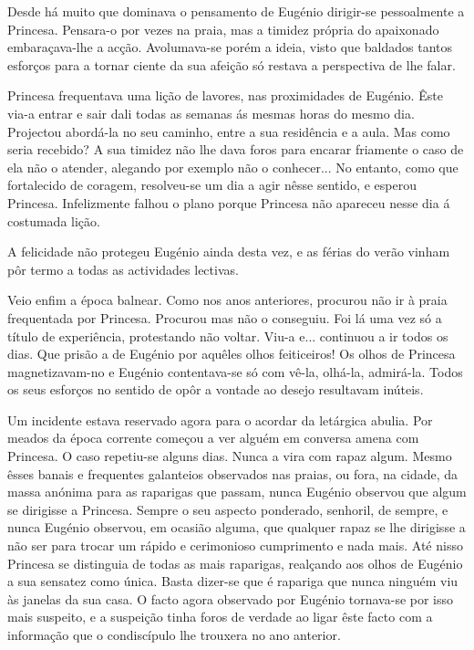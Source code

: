 \documentclass[9pt]{article}
\begin{document}
Desde há muito que dominava o pensamento de Eugé\-nio dirigir-se pessoalmente a Princesa. Pensara-o por vezes na praia, mas a timidez própria do
apaixonado embaraçava-\-lhe a ac\-ção. Avolumava-se porém a ideia, visto que
baldados tantos esforços para a tornar ciente da sua afei\-ção só restava a perspectiva de lhe falar.

Princesa frequentava uma li\-ção de lavores, nas proximidades de Eugé\-nio.
Êste via-a entrar e sair dali todas as semanas ás mesmas horas do mesmo
dia. Projectou abordá-la no seu caminho, entre a sua residên\-cia e a aula.
Mas como seria recebido? A sua timidez não lhe dava foros para encarar
friamente o caso de ela não o atender, alegando por exemplo não o conhecer...
No entanto, como que fortalecido de coragem, resolveu-se um dia a agir nêsse
sentido, e esperou Princesa. Infelizmente fa\-lhou o plano porque Princesa
não apareceu nesse dia á costumada li\-ção.

A felicidade não protegeu Eugé\-nio ainda desta vez, e as férias do
verão vinham pôr termo a todas as actividades lectivas.

Veio enfim a época balnear. Como nos anos anteriores, procurou
não ir à praia frequentada por Princesa. Procurou mas não o conseguiu.
Foi lá uma vez só a título de experiência, protestando não voltar. Viu-a e... continuou a ir todos os dias. Que prisão a de Eugé\-nio por
a\-quê\-les o\-lhos feiticeiros! Os o\-lhos de Princesa magnetizavam-no e
Eugé\-nio contentava-se só com vê-la, o\-lhá-la, admirá-la. Todos os seus esforços no sentido de opôr a vontade ao desejo resultavam inúteis.

Um incidente estava reservado agora para o acordar da letárgica
abulia. Por meados da época corrente começou a ver alguém em conversa
amena com Princesa. O caso repetiu-se alguns dias. Nunca a vira com
rapaz algum. Mesmo êsses banais e frequentes galanteios observados
nas praias, ou fora, na cidade, da massa anónima para as raparigas que passam, nunca Eugé\-nio observou que algum se dirigisse a Princesa. Sempre o seu aspecto
ponderado, senhoril, de sempre, e nunca Eugé\-nio observou, em ocasião alguma, que qualquer rapaz se lhe
dirigisse a não ser para trocar um rápido e cerimonioso cumprimento
e nada mais. Até nisso Princesa se distinguia de todas as mais raparigas, realçando aos o\-lhos de Eugé\-nio a sua sensatez como única. Basta
dizer-se que é rapariga que nunca nin\-guém viu às janelas da sua casa.
O facto agora observado por Eugé\-nio tornava-se por isso mais suspeito, e a suspei\-ção tinha foros de verdade ao ligar êste facto com a informa\-ção que o condiscípulo lhe trouxera no ano anterior.
\end{document}
